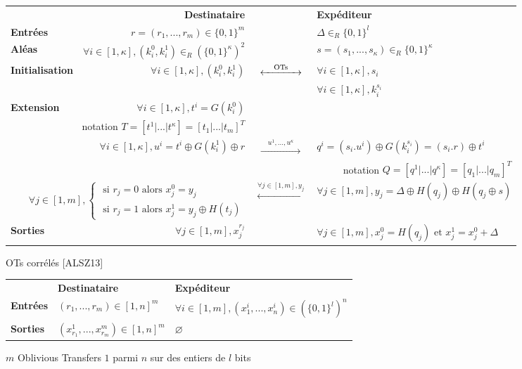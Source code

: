 \documentclass{article}
\begin{document}
\begin{figure}[h]
\centering
\begin{tabular}{|lrcl|}
\hline
 & \textbf{Destinataire} & & \textbf{Expéditeur}\\
\textbf{Entrées} & $r = (r_1,...,r_m) \in \{0,1\}^m$ & & $\Delta \in_R \{0, 1\}^l$ \\
\textbf{Aléas} & $\forall i \in [1,\kappa], (k_i^0, k_i^1) \in _R \left( \{0,1\}^{\kappa} \right) ^2$ & & $s=(s_1,...,s_{\kappa}) \in_R \{0,1\}^{\kappa}$\\
\textbf{Initialisation} & $\forall i \in [1,\kappa], (k_i^0, k_i^1)$ & $\xleftrightarrow{\hspace{1em} \text{OTs} \hspace{1em}}$ & $\forall i \in [1,\kappa], s_i$ \\
 & & & $\forall i \in [1,\kappa], k_i^{s_i}$ \\
\textbf{Extension} & $\forall i \in [1,\kappa], t^i = G(k_i^0)$& & \\
\multicolumn{2}{|r}{notation $T = [t^1|...|t^{\kappa}]=[t_1|...|t_m]^T$} & & \\
 & $\forall i \in [1,\kappa], u^i = t^i \oplus G(k_i^1) \oplus r$ & $\xrightarrow{\hspace{1em} u^1, ..., u^{\kappa} \hspace{1em}}$ & $q^i = (s_i. u^i)\oplus G(k_i^{s_i}) = (s_i.r) \oplus t^i$ \\
\multicolumn{4}{|r|}{notation $Q = [q^1|...|q^{\kappa}] = [q_1|...|q_m]^T$} \\
\multicolumn{2}{|r}{ $\forall j \in [1,m], \begin{cases} \text{ si } r_j =0 \text{ alors } x_j^0 = y_j \\ \text{ si } r_j =1 \text{ alors } x_j^{1} = y_j \oplus H(t_j) \end{cases} $} & $\xleftarrow{\forall j \in [1,m], y_j}$ & $\forall j \in [1,m], y_j = \Delta \oplus H(q_j) \oplus H(q_j \oplus s)$ \\
\textbf{Sorties} & $\forall j \in [1,m], x_j^{r_j}$& & $\forall j \in [1,m], x_j^0 = H(q_j) \text{ et } x_j^1 = x_j^0 + \Delta$ \\
\hline
\end{tabular}
\captionsetup{labelformat=empty}
\caption{OTs corrélés [ALSZ13]}
\end{figure}

\begin{figure}[h]
\centering
\begin{small}
\begin{tabular}{|lll|}
\hline
 & \textbf{Destinataire} & \textbf{Expéditeur}\\
\textbf{Entrées} & $(r_1, ..., r_m) \in [1,n]^m$ & $\forall i \in [1,m], (x_1^i, ..., x_n^i) \in (\{0, 1\}^l)^n$ \\
\textbf{Sorties} & $(x_{r_1}^1, ..., x_{r_m}^m) \in [1,n]^m$ & $\varnothing$ \\
\hline
\end{tabular}
\end{small}
\captionsetup{labelformat=empty}
\caption{$m$ Oblivious Transfers $1$ parmi $n$ sur des entiers de $l$ bits}
\end{figure}
\end{document}
